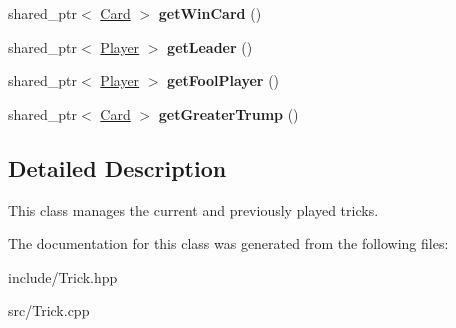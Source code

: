 \begin{DoxyCompactItemize}
\item 
\hypertarget{classTrick_a38816b1d7ccd9c8d576539463b6de715}{shared\-\_\-ptr$<$ \hyperlink{classCard}{\-Card} $>$ {\bfseries get\-Win\-Card} ()}\label{classTrick_a38816b1d7ccd9c8d576539463b6de715}

\item 
\hypertarget{classTrick_a6cf416941e5dc87aee4b8e38e57a27b2}{shared\-\_\-ptr$<$ \hyperlink{classPlayer}{\-Player} $>$ {\bfseries get\-Leader} ()}\label{classTrick_a6cf416941e5dc87aee4b8e38e57a27b2}

\item 
\hypertarget{classTrick_a8d0441b13d4724c5f4e91b207ffcfce4}{shared\-\_\-ptr$<$ \hyperlink{classPlayer}{\-Player} $>$ {\bfseries get\-Fool\-Player} ()}\label{classTrick_a8d0441b13d4724c5f4e91b207ffcfce4}

\item 
\hypertarget{classTrick_a920da981bd20ca7ce3f8f0965dbb050c}{shared\-\_\-ptr$<$ \hyperlink{classCard}{\-Card} $>$ {\bfseries get\-Greater\-Trump} ()}\label{classTrick_a920da981bd20ca7ce3f8f0965dbb050c}

\end{DoxyCompactItemize}


\subsection{\-Detailed \-Description}
\-This class manages the current and previously played tricks. 

\-The documentation for this class was generated from the following files\-:\begin{DoxyCompactItemize}
\item 
include/\-Trick.\-hpp\item 
src/\-Trick.\-cpp\end{DoxyCompactItemize}

